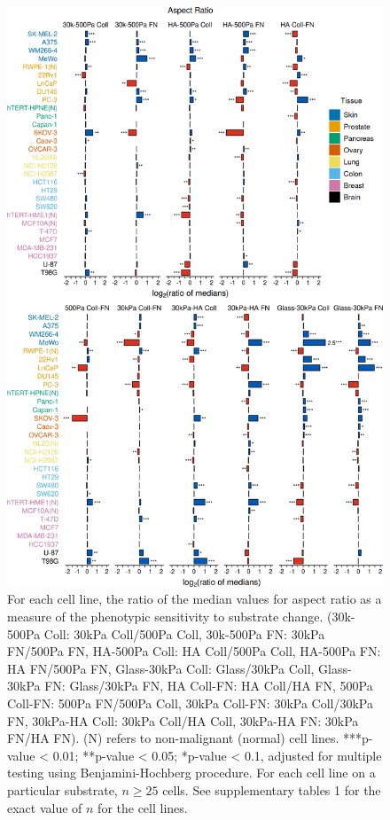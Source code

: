\documentclass[11pt,letterpaper,english,oneside]{article} %
\begin{document}
\begin{figure}[H]
    \vspace*{-0.65cm}
    \centering
    \includegraphics{../Figures/Supplementary_Figure4/supplementary_figure4.png}
    \caption{For each cell line, the ratio of the median values for aspect ratio as a measure of the phenotypic sensitivity to substrate change. 
    (30k-500Pa Coll: 30kPa Coll/500Pa Coll, 30k-500Pa FN: 30kPa FN/500Pa FN, HA-500Pa Coll: HA Coll/500Pa Coll, HA-500Pa  FN: HA FN/500Pa FN, Glass-30kPa Coll: Glass/30kPa Coll, Glass-30kPa FN: Glass/30kPa FN, 
    HA Coll-FN: HA Coll/HA FN, 500Pa Coll-FN: 500Pa FN/500Pa Coll, 30kPa Coll-FN: 30kPa Coll/30kPa FN, 30kPa-HA Coll: 30kPa Coll/HA Coll, 30kPa-HA FN: 30kPa FN/HA FN). (N) refers to non-malignant (normal) cell lines.
    ***p-value < 0.01; **p-value < 0.05; *p-value < 0.1, adjusted for multiple testing using Benjamini-Hochberg procedure. 
    For each cell line on a particular substrate, $n \geq 25$ cells.
    See supplementary tables 1 for the exact value of $n$ for the cell lines.}
    \label{fig:fig4}
\end{figure}
\end{document}
